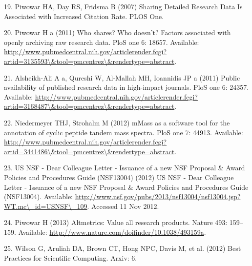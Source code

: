 \documentclass[]{article}
\begin{document}
19. Piwowar HA, Day RS, Fridsma B (2007) Sharing Detailed Research Data
Is Associated with Increased Citation Rate. PLOS One.

20. Piwowar H a (2011) Who shares? Who doesn't? Factors associated with
openly archiving raw research data. PloS one 6: 18657. Available:
\href{http://www.pubmedcentral.nih.gov/articlerender.fcgi?artid=3135593\textbackslash{}\&tool=pmcentrez\textbackslash{}\&rendertype=abstract}{http://www.pubmedcentral.nih.gov/articlerender.fcgi?artid=3135593\textbackslash{}\&tool=pmcentrez\textbackslash{}\&rendertype=abstract}.

21. Alsheikh-Ali A a, Qureshi W, Al-Mallah MH, Ioannidis JP a (2011)
Public availability of published research data in high-impact journals.
PloS one 6: 24357. Available:
\href{http://www.pubmedcentral.nih.gov/articlerender.fcgi?artid=3168487\textbackslash{}\&tool=pmcentrez\textbackslash{}\&rendertype=abstract}{http://www.pubmedcentral.nih.gov/articlerender.fcgi?artid=3168487\textbackslash{}\&tool=pmcentrez\textbackslash{}\&rendertype=abstract}.

22. Niedermeyer THJ, Strohalm M (2012) mMass as a software tool for the
annotation of cyclic peptide tandem mass spectra. PloS one 7: 44913.
Available:
\href{http://www.pubmedcentral.nih.gov/articlerender.fcgi?artid=3441486\textbackslash{}\&tool=pmcentrez\textbackslash{}\&rendertype=abstract}{http://www.pubmedcentral.nih.gov/articlerender.fcgi?artid=3441486\textbackslash{}\&tool=pmcentrez\textbackslash{}\&rendertype=abstract}.

23. US NSF - Dear Colleague Letter - Issuance of a new NSF Proposal \&
Award Policies and Procedures Guide (NSF13004) (2012) US NSF - Dear
Colleague Letter - Issuance of a new NSF Proposal \& Award Policies and
Procedures Guide (NSF13004). Available:
\href{http://www.nsf.gov/pubs/2013/nsf13004/nsf13004.jsp?WT.mc\textbackslash{}\_id=USNSF\textbackslash{}\_109}{http://www.nsf.gov/pubs/2013/nsf13004/nsf13004.jsp?WT.mc\textbackslash{}\_id=USNSF\textbackslash{}\_109}.
Accessed 11 Nov 2012.

24. Piwowar H (2013) Altmetrics: Value all research products. Nature
493: 159--159. Available:
\href{http://www.nature.com/doifinder/10.1038/493159a}{http://www.nature.com/doifinder/10.1038/493159a}.

25. Wilson G, Aruliah DA, Brown CT, Hong NPC, Davis M, et al. (2012)
Best Practices for Scientific Computing. Arxiv: 6.
\end{document}
